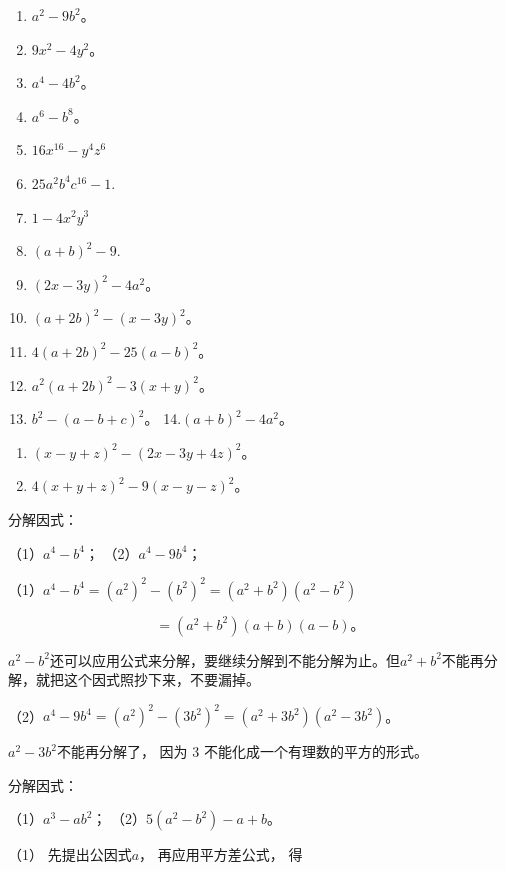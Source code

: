 \begin{enumerate}[start=1]
\item
  \(a^2 - 9b^2\)。
\item
  \(9x^{2} - 4y^{2}\)。
\item
  \(a^4 - 4b^2\)。
\item
  \(a^6 - b^8\)。
\item
  \(16x^{16} - y^4 z^6\)
\item
  \(25a^{2}b^{4}c^{16} - 1.\)
\item
  \(1 - 4x^{2}y^{3}\)
\item
  \((a + b)^{2} - 9.\)
\item
  \((2x - 3y)^{2} - 4a^{2}\)。
\item
  \((a + 2b)^{2} - (x - 3y)^{2}\)。
\item
  \(4(a + 2b)^{2} - 25(a - b)^{2}\)。
\item
  \(a^{2}(a + 2b)^{2} - 3(x + y)^{2}\)。
\item
  \(b^{2} - (a - b + c)^{2}\)。 14.\((a + b)^{2} - 4a^{2}\)。
\end{enumerate}

\begin{enumerate}[start=15]
\item
  \((x - y + z)^{2} - (2x - 3y + 4z)^{2}\)。
\item
  \(4(x + y + z)^{2} - 9(x - y - z)^{2}\)。
\end{enumerate}

 分解因式：

（1）\(a^4 - b^4\)； （2）\(a^4 - 9b^4\)；

（1）\(a^4 - b^4 = (a^2)^2 - (b^2)^2 = (a^2 + b^2)(a^2 - b^2)\)

\[
= (a ^{2} + b ^{2}) (a + b) (a - b)\text{。}
\]

\(a^2 - b^2\)还可以应用公式来分解，要继续分解到不能分解为止。但\(a^2 + b^2\)不能再分解，就把这个因式照抄下来，不要漏掉。

（2）\(a^4 - 9b^4 = (a^2)^2 - (3b^2)^2 = (a^2 + 3b^2)(a^2 - 3b^2)\)。

\(a^2 - 3b^2\)不能再分解了， 因为 3
不能化成一个有理数的平方的形式。

 分解因式：

（1）\(a^3 - ab^2\)； （2）\(5(a^2 - b^2) - a + b\)。

 （1） 先提出公因式\(a\)， 再应用平方差公式， 得

